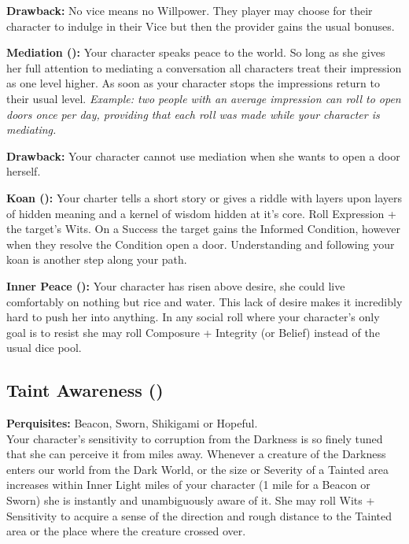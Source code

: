 \textbf{Drawback:} No vice means no Willpower. They player may choose for their character to indulge in their Vice but then the provider gains the usual bonuses. 

\textbf{Mediation (\textbullet\textbullet\textbullet):} Your character speaks peace to the world. So long as she gives her full attention to mediating a conversation all characters treat their impression as one level higher. As soon as your character stops the impressions return to their usual level. \textit{Example: two people with an average impression can roll to open doors once per day, providing that each roll was made while your character is mediating.}

\textbf{Drawback:} Your character cannot use mediation when she wants to open a door herself.

\textbf{Koan (\textbullet\textbullet\textbullet\textbullet):} Your charter tells a short story or gives a riddle with layers upon layers of hidden meaning and a kernel of wisdom hidden at it's core. Roll Expression + the target's Wits. On a Success the target gains the Informed Condition, however when they resolve the Condition open a door. Understanding and following your koan is another step along your path.

\textbf{Inner Peace (\textbullet\textbullet\textbullet\textbullet\textbullet):} Your character has risen above desire, she could live comfortably on nothing but rice and water. This lack of desire makes it incredibly hard to push her into anything. In any social roll where your character's only goal is to resist she may roll Composure + Integrity (or Belief) instead of the usual dice pool.

\subsection*{Taint Awareness (\textbullet\textbullet)}
\textbf{Perquisites:} Beacon, Sworn, Shikigami or Hopeful.\\

\noindent Your character's sensitivity to corruption from the Darkness is so finely tuned that she can perceive it from miles away. Whenever a creature of the Darkness enters our world from the Dark World, or the size or Severity of a Tainted area increases within Inner Light miles of your character (1 mile for a Beacon or Sworn) she is instantly and unambiguously aware of it. She may roll Wits + Sensitivity to acquire a sense of the direction and rough distance to the Tainted area or the place where the creature crossed over.

